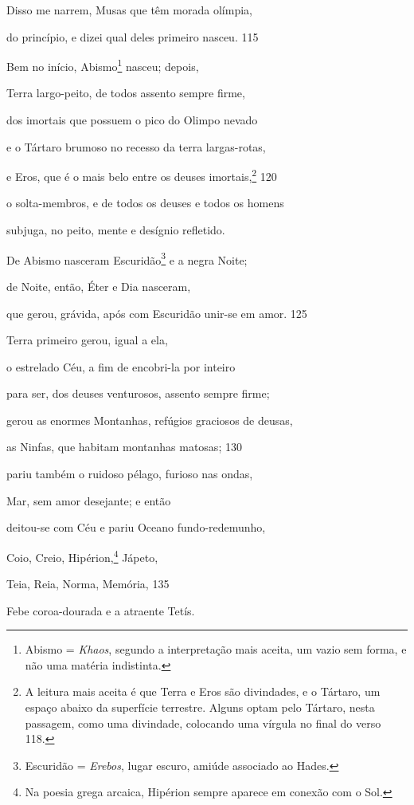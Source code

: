 Disso me narrem, Musas que têm morada olímpia,

do princípio, e dizei qual deles primeiro nasceu. \num{115}

\quad{}Bem no início, Abismo\footnote{Abismo = \emph{Khaos}, segundo a interpretação mais aceita, um
vazio sem forma, e não uma matéria indistinta.} nasceu; depois,

Terra largo-peito, de todos assento sempre firme,

dos imortais que possuem o pico do Olimpo nevado

e o Tártaro brumoso no recesso da terra largas-rotas,

e Eros, que é o mais belo entre os deuses imortais,\footnote{A leitura mais aceita é que Terra e Eros são divindades, e o
Tártaro, um espaço abaixo da superfície terrestre. Alguns optam pelo
Tártaro, nesta passagem, como uma divindade, colocando uma vírgula no
final do verso 118.} \num{120}

o solta-membros, e de todos os deuses e todos os homens

subjuga, no peito, mente e desígnio refletido.

\medskip

De Abismo nasceram Escuridão\footnote{Escuridão = \emph{Erebos}, lugar escuro, amiúde associado ao Hades.} e a negra Noite;

de Noite, então, Éter e Dia nasceram,

que gerou, grávida, após com Escuridão unir-se em amor. \num{125}

\medskip

Terra primeiro gerou, igual a ela,

o estrelado Céu, a fim de encobri-la por inteiro

para ser, dos deuses venturosos, assento sempre firme;

gerou as enormes Montanhas, refúgios graciosos de deusas,

as Ninfas, que habitam montanhas matosas; \num{130}

pariu também o ruidoso pélago, furioso nas ondas,

Mar, sem amor desejante; e então

deitou-se com Céu e pariu Oceano fundo-redemunho,

Coio, Creio, Hipérion,\footnote{Na poesia grega arcaica, Hipérion sempre aparece em conexão com o
Sol.} Jápeto,

Teia, Reia, Norma, Memória, \num{135}

Febe coroa-dourada e a atraente Tetís.

